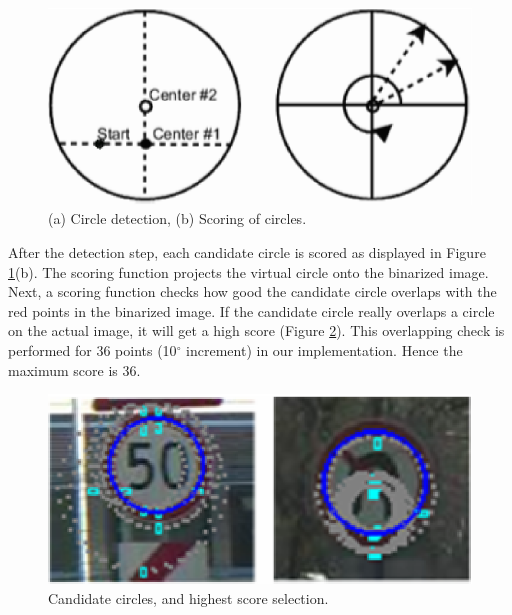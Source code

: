 \documentclass[review,number]{elsarticle}
\begin{document}
\begin{figure}[ht]
\begin{center}
\includegraphics[scale=0.5]{img/signfig10.eps}
\caption{(a) Circle detection, (b) Scoring of circles.}
\label{signfig10}
\end{center}
\end{figure}
\par
After the detection step, each candidate circle is scored as displayed in Figure \ref{signfig10}(b). The scoring function projects the virtual circle onto the binarized image. Next, a scoring function checks how good the candidate circle overlaps with the red points in the binarized image. If the candidate circle really overlaps a circle on the actual image, it will get a high score (Figure \ref{signfig11}). This overlapping check is performed for $36$ points (10$^{\circ}$ increment) in our implementation. Hence the maximum score is $36$.
\par
\begin{figure}[ht]
\begin{center}
\includegraphics[scale=0.5]{img/signfig11.eps}
\caption{Candidate circles, and highest score selection.}
\label{signfig11}
\end{center}
\end{figure}
\par
\end{document}
